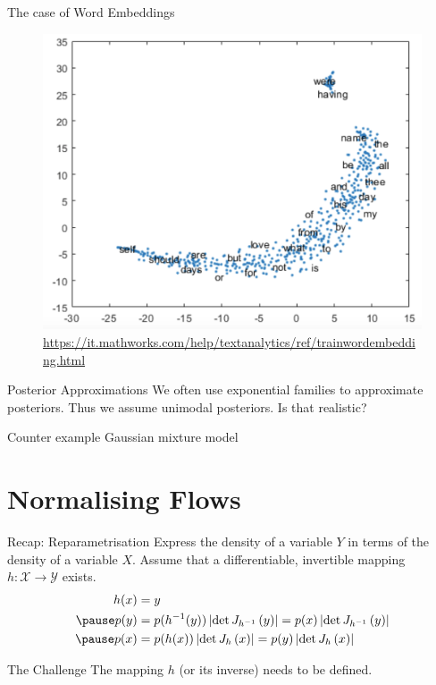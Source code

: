 \documentclass[14pt]{beamer}
\begin{document}
\begin{frame}{The case of Word Embeddings}
\pause
\begin{figure}
\includegraphics[scale=.2]{wordcloud.png}
\caption{\url{https://it.mathworks.com/help/textanalytics/ref/trainwordembedding.html}}
\end{figure}
\end{frame}

\begin{frame}{Posterior Approximations}
We often use exponential families to approximate posteriors. Thus we assume unimodal posteriors. Is that realistic?
\pause
\begin{block}{Counter example}
Gaussian mixture model
\end{block}
\end{frame}

\section{Normalising Flows}

\begin{frame}
\tableofcontents[current]
\end{frame}

\begin{frame}{Recap: Reparametrisation}
Express the density of a variable $ Y $ in terms of the density of a variable $ X $. Assume that a differentiable, invertible mapping
$ h: \mathcal{X} \rightarrow \mathcal{Y} $ exists.
\begin{equation*}
\begin{aligned}
h(x) &= y \\ \pause
p(y) &= p(h^{-1}(y))\djac{h^{-1}}{y} = p(x)\djac{h^{-1}}{y}  \\ \pause
p(x) &= p(h(x))\djac{h}{x} = p(y)\djac{h}{x}
\end{aligned}
\end{equation*}
\pause
\begin{block}{The Challenge}
The mapping $ h $ (or its inverse) needs to be defined.
\end{block}
\end{frame}
\end{document}

